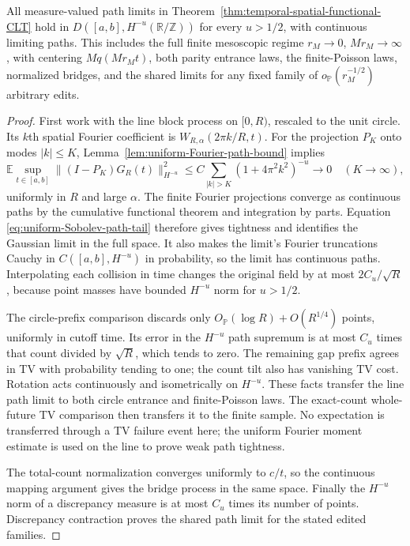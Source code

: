 \documentclass[11pt,letterpaper]{article}
\newcommand{\PP}{\mathbb P}\newcommand{\EE}{\mathbb E}
\newcommand{\T}{\mathbb R/\mathbb Z}\newcommand{\Leb}{\operatorname{Leb}}
\begin{document}
\begin{corollary}
\label{cor:full-sobolev-temporal-CLT}
All measure-valued path limits in
Theorem~\ref{thm:temporal-spatial-functional-CLT} hold in
$D([a,b],H^{-u}(\T))$ for every $u>1/2$, with continuous
limiting paths. This includes the full finite mesoscopic regime
$r_M\to0$, $Mr_M\to\infty$, with centering $Mq(Mr_Mt)$,
both parity entrance laws, the finite-Poisson laws, normalized
bridges, and the shared limits for any fixed family of
$o_{\PP}(r_M^{-1/2})$ arbitrary edits.
\end{corollary}
\begin{proof}
First work with the line block process on $[0,R)$, rescaled
to the unit circle. Its $k$th spatial Fourier coefficient is
$W_{R,\alpha}(2\pi k/R,t)$.
For the projection $P_K$ onto modes $|k|\le K$,
Lemma~\ref{lem:uniform-Fourier-path-bound} implies
\begin{equation}\label{eq:uniform-Sobolev-path-tail}
 \EE\sup_{t\in[a,b]}\|(I-P_K)G_R(t)\|_{H^{-u}}^2
       \le C\sum_{|k|>K}(1+4\pi^2k^2)^{-u}\longrightarrow0
                                      \quad(K\to\infty),
\end{equation}
uniformly in $R$ and large $\alpha$. The finite Fourier
projections converge as continuous paths by the cumulative
functional theorem and integration by parts. Equation
\eqref{eq:uniform-Sobolev-path-tail} therefore gives tightness
and identifies the Gaussian limit in the full space. It also
makes the limit's Fourier truncations Cauchy in
$C([a,b],H^{-u})$ in probability, so the limit has continuous
paths. Interpolating each collision in time changes the original
field by at most $2C_u/\sqrt R$, because point masses have
bounded $H^{-u}$ norm for $u>1/2$.

The circle-prefix comparison discards only
$O_{\PP}(\log R)+O(R^{1/4})$ points, uniformly in cutoff time.
Its error in the $H^{-u}$ path supremum is at most $C_u$ times
that count divided by $\sqrt R$, which tends to zero.
The remaining gap prefix agrees in TV with probability tending
to one; the count tilt also has vanishing TV cost. Rotation
acts continuously and isometrically on $H^{-u}$. These facts
transfer the line path limit to both circle entrance and
finite-Poisson laws. The exact-count whole-future TV comparison
then transfers it to the finite sample. No expectation is
transferred through a TV failure event here; the uniform Fourier
moment estimate is used on the line to prove weak path tightness.

The total-count normalization converges uniformly to $c/t$,
so the continuous mapping argument gives the bridge process
in the same space. Finally the $H^{-u}$ norm of a discrepancy
measure is at most $C_u$ times its number of points.
Discrepancy contraction proves the shared path limit for the
stated edited families.
\end{proof}
\end{document}
